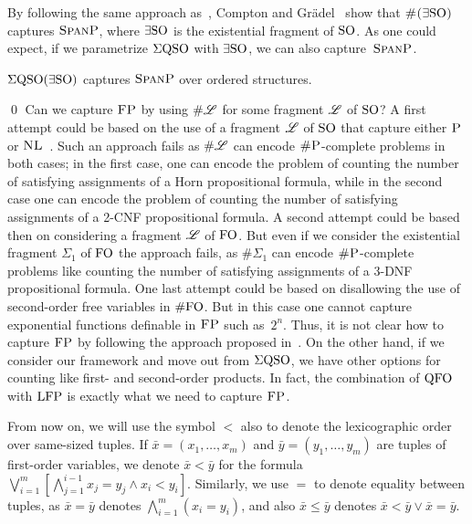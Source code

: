 By following the same approach as~\cite{SalujaST95}, Compton and Gr\"adel~\cite{ComptonG96} show that $\text{\sc \#($\exists{\rm SO}$)}$ captures $\text{\sc SpanP}$, where $\exists{\rm SO}$ is the existential fragment of ${\rm SO}$. As one could expect, if we parametrize $\Sigma{\rm QSO}$ with $\exists{\rm SO}$, we can also capture~$\text{\sc SpanP}$.
\begin{prop} \label{prop:capture-spanP}
	$\Sigma{\rm QSO}(\exists{\rm SO})$ captures $\text{\sc SpanP}$ over ordered structures.
\end{prop}
\proof

\qed
Can we capture $\text{\sc FP}$ by using $\# \mathscr{L}$ for some fragment $\mathscr{L}$ of ${\rm SO}$? A first attempt could be based on the use of a fragment $\mathscr{L}$ of ${\rm SO}$ that capture either $\text{\sc P}$ or $\text{\sc NL}$~\cite{G92}. Such an approach fails as $\# \mathscr{L}$ can encode $\text{\sc \#P}$-complete problems in both cases; in the first case, one can encode the problem of counting the number of satisfying assignments of a Horn  propositional formula, while in the second case one can encode the problem of counting the number of satisfying assignments of a 2-CNF propositional formula. A second attempt could be based then on considering a fragment $\mathscr{L}$ of ${\rm FO}$. 
But even if we consider the existential fragment $\Sigma_1$ of ${\rm FO}$ the approach fails, as $\# \Sigma_1$ can encode $\text{\sc \#P}$-complete problems like counting the number of satisfying assignments of a 3-DNF propositional formula\cite{SalujaST95}. One last attempt could be based on disallowing the use of second-order free variables in $\#{\rm FO}$. But in this case one 
cannot capture exponential functions definable in $\text{\sc FP}$ such as~$2^n$.
Thus, it is not  clear how to capture $\text{\sc FP}$ 
by following the approach proposed in~\cite{SalujaST95}. 
On the other hand, if we consider our framework and move out from $\Sigma{\rm QSO}$, we have other options for counting like first- and second-order products. In fact, the combination of ${\rm QFO}$ with ${\rm LFP}$ is exactly what we need to capture $\text{\sc FP}$.

From now on, we will use the symbol $<$ also to denote the lexicographic order over same-sized tuples. If $\bar{x} = (x_1,\ldots,x_m)$ and $\bar{y} = (y_1,\ldots,y_m)$ are tuples of first-order variables, we denote $\bar{x} < \bar{y}$ for the formula $\bigvee_{i = 1}^m[\bigwedge_{j = 1}^{i-1}x_j = y_j \wedge x_i < y_i]$. Similarly, we use $=$ to denote equality between tuples, as $\bar{x} = \bar{y}$ denotes $\bigwedge_{i = 1}^m(x_i = y_i)$, and also $\bar{x}\leq\bar{y}$ denotes $\bar{x} < \bar{y} \vee \bar{x} = \bar{y}$.

